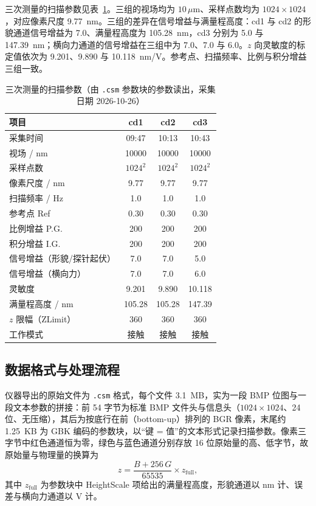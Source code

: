 \documentclass[12pt,a4paper,fontset=windows]{ctexart}
\begin{document}
三次测量的扫描参数见表~\ref{tab:params}。三组的视场均为 $10\,\mu\mathrm{m}$、采样点数均为 $1024\times1024$，对应像素尺度 9.77~nm。三组的差异在信号增益与满量程高度：cd1 与 cd2 的形貌通道信号增益为 7.0、满量程高度为 105.28~nm，cd3 分别为 5.0 与 147.39~nm；横向力通道的信号增益在三组中为 7.0、7.0 与 6.0。$z$ 向灵敏度的标定值依次为 9.201、9.890 与 10.118~nm/V。参考点、扫描频率、比例与积分增益三组一致。

\begin{table}[H]
\centering
\caption{三次测量的扫描参数（由 \texttt{.csm} 参数块的参数读出，采集日期 2026-10-26）}
\label{tab:params}
\small
{}
\begin{tabular}{@{}lccc@{}}
\toprule
项目 & cd1 & cd2 & cd3 \\
\midrule
采集时间 & 09:47 & 10:13 & 10:43 \\
视场 / nm & 10000 & 10000 & 10000 \\
采样点数 & $1024^2$ & $1024^2$ & $1024^2$ \\
像素尺度 / nm & 9.77 & 9.77 & 9.77 \\
扫描频率 / Hz & 1.0 & 1.0 & 1.0 \\
参考点 Ref & 0.30 & 0.30 & 0.30 \\
比例增益 P.G. & 200 & 200 & 200 \\
积分增益 I.G. & 200 & 200 & 200 \\
信号增益（形貌/探针起伏）& 7.0 & 7.0 & 5.0 \\
信号增益（横向力）& 7.0 & 7.0 & 6.0 \\
灵敏度 & 9.201 & 9.890 & 10.118 \\
满量程高度 / nm & 105.28 & 105.28 & 147.39 \\
$z$ 限幅（ZLimit）& 360 & 360 & 360 \\
工作模式 & 接触 & 接触 & 接触 \\
\bottomrule
\end{tabular}
\end{table}

\subsection{数据格式与处理流程}

仪器导出的原始文件为 \texttt{.csm} 格式，每个文件 3.1~MB，实为一段 BMP 位图与一段文本参数的拼接：前 54 字节为标准 BMP 文件头与信息头（$1024\times1024$、24 位、无压缩），其后为按底行在前（bottom-up）排列的 BGR 像素，末尾约 1.25~KB 为 GBK 编码的参数块，以“键 = 值”的文本形式记录扫描参数。像素三字节中红色通道恒为零，绿色与蓝色通道分别存放 16 位原始量的高、低字节，故原始量与物理量的换算为
\begin{equation}
z = \frac{B + 256\,G}{65535}\times z_{\text{full}},
\label{eq:decode}
\end{equation}
其中 $z_{\text{full}}$ 为参数块中 HeightScale 项给出的满量程高度，形貌通道以 nm 计、误差与横向力通道以 V 计。
\end{document}

